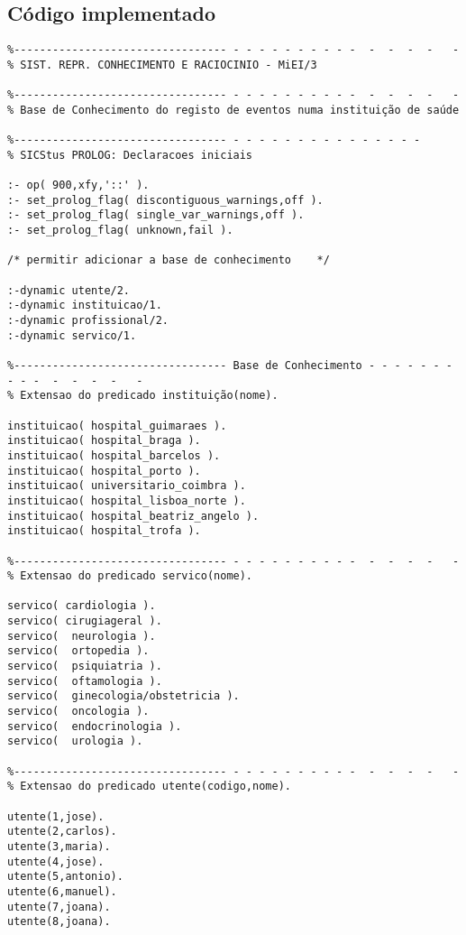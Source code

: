 \documentclass[pdftex,12pt,a4paper]{report}
\begin{document}


\tableofcontents
\listoffigures 





\begin{appendices}
	\chapter{Código implementado}
\begin{Verbatim}
%--------------------------------- - - - - - - - - - -  -  -  -  -   -
% SIST. REPR. CONHECIMENTO E RACIOCINIO - MiEI/3

%--------------------------------- - - - - - - - - - -  -  -  -  -   -
% Base de Conhecimento do registo de eventos numa instituição de saúde

%--------------------------------- - - - - - - - - - - - - - - -
% SICStus PROLOG: Declaracoes iniciais

:- op( 900,xfy,'::' ).
:- set_prolog_flag( discontiguous_warnings,off ).
:- set_prolog_flag( single_var_warnings,off ).
:- set_prolog_flag( unknown,fail ).

/* permitir adicionar a base de conhecimento	*/

:-dynamic utente/2.
:-dynamic instituicao/1.
:-dynamic profissional/2.
:-dynamic servico/1.

%--------------------------------- Base de Conhecimento - - - - - - - - - -  -  -  -  -   -
% Extensao do predicado instituição(nome). 

instituicao( hospital_guimaraes ). 
instituicao( hospital_braga ).
instituicao( hospital_barcelos ).
instituicao( hospital_porto ).
instituicao( universitario_coimbra ).
instituicao( hospital_lisboa_norte ).
instituicao( hospital_beatriz_angelo ).
instituicao( hospital_trofa ).

%--------------------------------- - - - - - - - - - -  -  -  -  -   -
% Extensao do predicado servico(nome).

servico( cardiologia ). 
servico( cirugiageral ).
servico(  neurologia ).
servico(  ortopedia ).
servico(  psiquiatria ).
servico(  oftamologia ).
servico(  ginecologia/obstetricia ).
servico(  oncologia ).
servico(  endocrinologia ).
servico(  urologia ).  

%--------------------------------- - - - - - - - - - -  -  -  -  -   -
% Extensao do predicado utente(codigo,nome).

utente(1,jose).  
utente(2,carlos). 
utente(3,maria). 
utente(4,jose).   
utente(5,antonio). 
utente(6,manuel).  
utente(7,joana).
utente(8,joana).  


\end{Verbatim}
\end{appendices}
\end{document}
